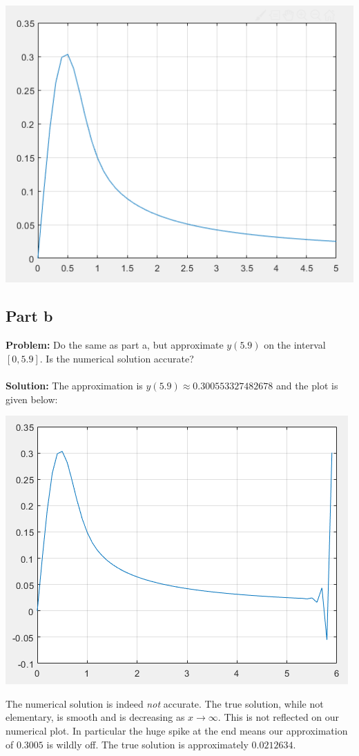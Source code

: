 \documentclass{article}
\begin{document}
\begin{center}
  \includegraphics[scale=0.7]{plot1.png}
\end{center}


\subsection*{Part b}
\textbf{Problem:} Do the same as part a, but approximate $y(5.9)$ on the interval $[0,5.9]$. Is the numerical solution accurate?
\\\\
\textbf{Solution:} The approximation is $y(5.9)\approx 0.300553327482678$ and the plot is given below:

\begin{center}
  \includegraphics[scale=0.7]{plot2.png}
\end{center}

The numerical solution is indeed \emph{not} accurate. The true solution, while not elementary, is smooth and is decreasing as $x\to\infty$. This is not reflected on our numerical plot. In particular the huge spike at the end means our approximation of $0.3005$ is wildly off. The true solution is approximately $0.0212634$.
\end{document}
